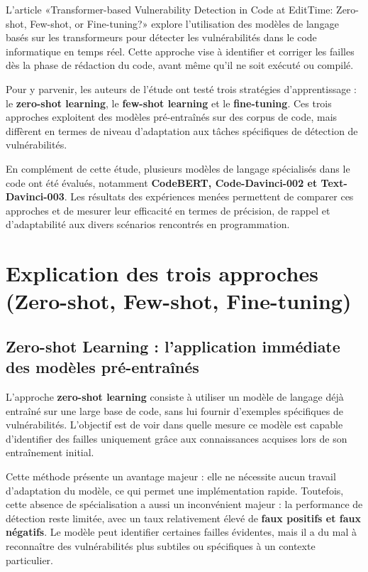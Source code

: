 \label{part2}\begin{center} L’article «Transformer-based Vulnerability
Detection in Code at EditTime: Zero-shot, Few-shot, or Fine-tuning?» explore
l’utilisation des modèles de langage basés sur les transformeurs pour détecter
les vulnérabilités dans le code informatique en temps réel. Cette approche vise
à identifier et corriger les failles dès la phase de rédaction du code, avant
même qu’il ne soit exécuté ou compilé.



Pour y parvenir, les auteurs de l’étude ont
testé trois stratégies d’apprentissage : le \textbf{zero-shot learning}, le \textbf{few-shot
learning} et le \textbf{fine-tuning}. Ces trois approches exploitent des
modèles pré-entraînés sur des corpus de code, mais diffèrent en termes de
niveau d’adaptation aux tâches spécifiques de détection de vulnérabilités.



En complément de cette étude, plusieurs
modèles de langage spécialisés dans le code ont été évalués, notamment \textbf{CodeBERT,
Code-Davinci-002 et Text-Davinci-003}. Les résultats des expériences menées
permettent de comparer ces approches et de mesurer leur efficacité en termes de
précision, de rappel et d’adaptabilité aux divers scénarios rencontrés en
programmation.\end{center}
\chapter{Explication des trois approches (Zero-shot, Few-shot, Fine-tuning)}



\section{Zero-shot Learning : l’application immédiate des modèles pré-entraînés}

L’approche \textbf{zero-shot learning} consiste à utiliser un modèle de langage déjà entraîné
sur une large base de code, sans lui fournir d’exemples spécifiques de vulnérabilités. L’objectif est
de voir dans quelle mesure ce modèle est capable d’identifier des failles
uniquement grâce aux connaissances acquises lors de son entraînement initial.

Cette méthode présente un avantage majeur :
elle ne nécessite aucun travail d’adaptation du modèle, ce qui permet une
implémentation rapide. Toutefois, cette absence de spécialisation a aussi un
inconvénient majeur : la performance de détection reste limitée, avec un taux
relativement élevé de \textbf{faux positifs et faux négatifs}. Le modèle peut
identifier certaines failles évidentes, mais il a du mal à reconnaître des
vulnérabilités plus subtiles ou spécifiques à un contexte particulier.

